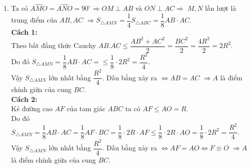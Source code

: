 \begin{bt}
{\begin{enumerate}
	Ta lại có:\\
	$\widehat{APC}=\widehat{ABC}$ (hai góc nội tiếp cùng chắn cung $AC$ của đường tròn $(O)$)\\
	$\widehat{ABC}=\widehat{HPO}$ (hai góc nội tiếp cùng chắn cung $OH$ của đường tròn ngoại tiếp $PHOB$)\\
	$\Rightarrow \widehat{APC}=\widehat{HPO}\,\,\,(2)$.\\
	Từ $(1)$ và $(2)$ $\Rightarrow \triangle APC \backsim \triangle HPO$ (g.g) $\Rightarrow \dfrac{AC}{OH}=\dfrac{PC}{PO}\Rightarrow \dfrac{OH\cdot PC}{AC}=PO=R$.\\
	Vậy $\dfrac{OH.PC}{AC}=R$ không phụ thuộc vào vị trí của các điểm $B,C$.
\item 
	Ta có $\widehat{AMO}=\widehat{ANO}=90^\circ\Rightarrow OM \perp AB$ và $ON \perp AC \Rightarrow$ $M,N$ lần lượt là trung điểm của $AB,AC$ $\Rightarrow S_{\triangle AMN}=\dfrac{1}{4}S_{\triangle ABC}=\dfrac{1}{8}AB\cdot AC$.\\
	{\bf Cách 1:}\\
	Theo bất đẳng thức Cauchy $AB.AC\leq\dfrac{AB^2+AC^2}{2}=\dfrac{BC^2}{2}=\dfrac{4R^2}{2}=2R^2$.\\
	Do đó
	$S_{\triangle AMN}=\dfrac{1}{8}AB\cdot AC=\leq\dfrac{1}{8}\cdot 2R^2=\dfrac{R^2}{4}$.\\
	Vậy $ S_{\triangle AMN}$ lớn nhất bằng $\dfrac{R^2}{4}$. Dấu bằng xảy ra $\Leftrightarrow AB=AC$ $\Rightarrow A$ là điểm chính giữa của cung $BC$.\\
	{\bf Cách 2:}\\
	Kẻ đường cao $AF$ của tam giác $ABC$ ta có $AF\leq AO=R$.\\
	Do đó
	$S_{\triangle AMN}=\dfrac{1}{8}AB\cdot AC=\dfrac{1}{8}AF\cdot BC=\dfrac{1}{8}\cdot 2R\cdot AF\leq \dfrac{1}{8}\cdot 2R\cdot AO=\dfrac{1}{8}\cdot 2R^2=\dfrac{R^2}{4}$.\\
	Vậy $ S_{\triangle AMN}$ lớn nhất bằng $\dfrac{R^2}{4}$. Dấu bằng xảy ra $\Leftrightarrow AF=AO\Leftrightarrow F\equiv O$ $\Rightarrow A$ là điểm chính giữa của cung $BC$.
\end{enumerate}	
	
	}
\end{bt}
